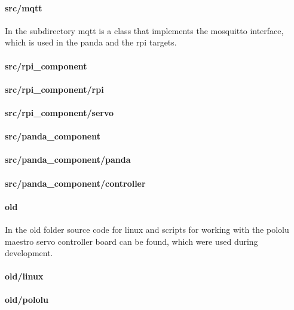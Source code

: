 \paragraph{src/mqtt}
In the subdirectory mqtt is a class that implements the mosquitto interface, which is used in the panda and the rpi targets.

\paragraph{src/rpi\_component}

\paragraph{src/rpi\_component/rpi}

\paragraph{src/rpi\_component/servo}

\paragraph{src/panda\_component}

\paragraph{src/panda\_component/panda}

\paragraph{src/panda\_component/controller}


\paragraph{old}
In the old folder source code for linux and scripts for working with the pololu maestro servo controller board can be found, which were used during development.

\paragraph{old/linux}

\paragraph{old/pololu}


